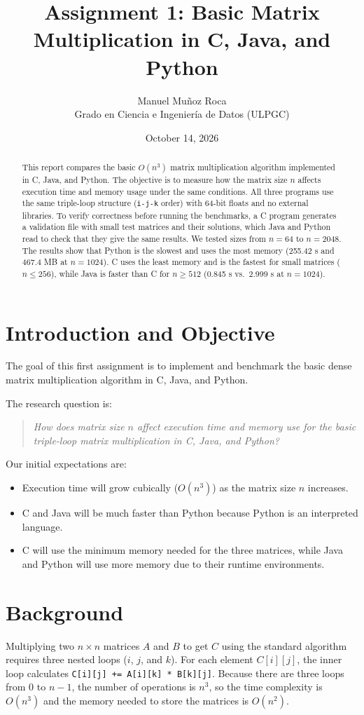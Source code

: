 \documentclass[11pt,a4paper]{article}
\title{\textbf{Assignment 1: Basic Matrix Multiplication in C, Java, and Python}}
\author{
    Manuel Mu\~noz Roca \\
    Grado en Ciencia e Ingenier\'ia de Datos (ULPGC)
}
\date{October 14, 2026}
\begin{document}
\maketitle

\begin{abstract}
\noindent
This report compares the basic $O(n^3)$ matrix multiplication algorithm implemented in C, Java, and Python. The objective is to measure how the matrix size $n$ affects execution time and memory usage under the same conditions. All three programs use the same triple-loop structure (\texttt{i-j-k} order) with 64-bit floats and no external libraries. To verify correctness before running the benchmarks, a C program generates a validation file with small test matrices and their solutions, which Java and Python read to check that they give the same results. We tested sizes from $n=64$ to $n=2048$. The results show that Python is the slowest and uses the most memory (255.42 s and 467.4 MB at $n=1024$). C uses the least memory and is the fastest for small matrices ($n \le 256$), while Java is faster than C for $n \ge 512$ (0.845 s vs.\ 2.999 s at $n=1024$).
\end{abstract}

\section{Introduction and Objective}
The goal of this first assignment is to implement and benchmark the basic dense matrix multiplication algorithm in C, Java, and Python. 

The research question is:
\begin{quote}
    \emph{How does matrix size $n$ affect execution time and memory use for the basic triple-loop matrix multiplication in C, Java, and Python?}
\end{quote}
Our initial expectations are:
\begin{itemize}
    \item Execution time will grow cubically ($O(n^3)$) as the matrix size $n$ increases.
    \item C and Java will be much faster than Python because Python is an interpreted language.
    \item C will use the minimum memory needed for the three matrices, while Java and Python will use more memory due to their runtime environments.
\end{itemize}

\section{Background}
Multiplying two $n \times n$ matrices $A$ and $B$ to get $C$ using the standard algorithm requires three nested loops ($i$, $j$, and $k$). For each element $C[i][j]$, the inner loop calculates \texttt{C[i][j] += A[i][k] * B[k][j]}. Because there are three loops from $0$ to $n-1$, the number of operations is $n^3$, so the time complexity is $O(n^3)$ and the memory needed to store the matrices is $O(n^2)$.
\end{document}

